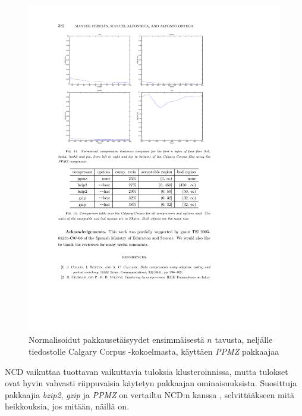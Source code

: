 \documentclass[12pt,finnish]{tktltiki2}
\theoremstyle{definition}
\theoremstyle{remark}
\begin{document}
    \begin{figure}[!htb]
        \immediate{}
      \includegraphics{img/ppmz}
      \caption{Normalisoidut pakkausetäisyydet ensimmäisestä $n$ tavusta, neljälle tiedostolle Calgary Corpus -kokoelmasta, käyttäen \emph{PPMZ} pakkaajaa \cite{cebrian2005common}}
      \label{fig:ppmz}
    \end{figure}

      NCD vaikuttaa tuottavan vaikuttavia tuloksia klusteroinnissa, mutta tulokset ovat hyvin vahvasti riippuvaisia käytetyn pakkaajan ominaisuuksista.
      Suosittuja pakkaajia \emph{bzip2}, \emph{gzip} ja \emph{PPMZ} on vertailtu NCD:n kanssa \cite{cebrian2005common}, selvittääkseen mitä heikkouksia, jos mitään, näillä on.
\end{document}
